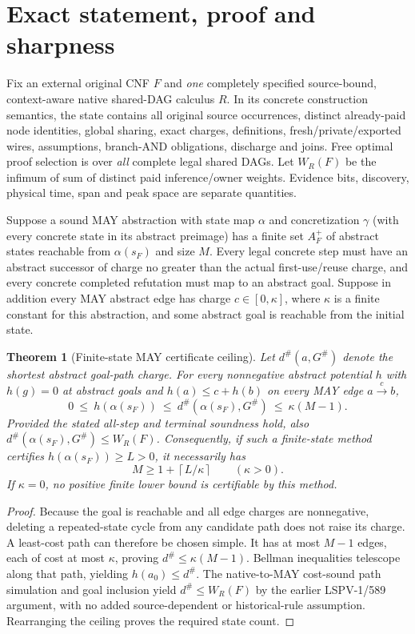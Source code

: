 \documentclass[11pt]{article}
\newtheorem{theorem}{Theorem}
\begin{document}
\section*{Exact statement, proof and sharpness}
Fix an external original CNF $F$ and \emph{one} completely specified source-bound, context-aware native shared-DAG calculus $R$. In its concrete construction semantics, the state contains all original source occurrences, distinct already-paid node identities, global sharing, exact charges, definitions, fresh/private/exported wires, assumptions, branch-AND obligations, discharge and joins. Free optimal proof selection is over \emph{all} complete legal shared DAGs. Let $W_R(F)$ be the infimum of sum of distinct paid inference/owner weights. Evidence bits, discovery, physical time, span and peak space are separate quantities.

Suppose a sound MAY abstraction with state map $\alpha$ and concretization $\gamma$ (with every concrete state in its abstract preimage) has a finite set $A_F^+$ of abstract states reachable from $\alpha(s_F)$ and size $M$. Every legal concrete step must have an abstract successor of charge no greater than the actual first-use/reuse charge, and every concrete completed refutation must map to an abstract goal. Suppose in addition every MAY abstract edge has charge $c\in[0,\kappa]$, where $\kappa$ is a finite constant for this abstraction, and some abstract goal is reachable from the initial state.

\begin{theorem}[Finite-state MAY certificate ceiling]
Let $d^\#(a,G^\#)$ denote the shortest abstract goal-path charge. For every nonnegative abstract potential $h$ with $h(g)=0$ at abstract goals and
$h(a)\leq c+h(b)$ on every MAY edge $a\xrightarrow{c}b$,
\[
0\ \leq\ h(\alpha(s_F))
\ \leq\ d^\#(\alpha(s_F),G^\#)
\ \leq\ \kappa(M-1).
\]
Provided the stated all-step and terminal soundness hold, also $d^\#(\alpha(s_F),G^\#)\leq W_R(F)$.
Consequently, if such a finite-state method certifies $h(\alpha(s_F))\geq L>0$, it necessarily has
\[
\boxed{\qquad M\geq 1+\left\lceil L/\kappa\right\rceil
\qquad(\kappa>0).\qquad}
\]
If $\kappa=0$, no positive finite lower bound is certifiable by this method.
\end{theorem}

\begin{proof}
Because the goal is reachable and all edge charges are nonnegative, deleting a repeated-state cycle from any candidate path does not raise its charge. A least-cost path can therefore be chosen simple. It has at most $M-1$ edges, each of cost at most $\kappa$, proving $d^\#\leq\kappa(M-1)$. Bellman inequalities telescope along that path, yielding $h(a_0)\leq d^\#$. The native-to-MAY cost-sound path simulation and goal inclusion yield $d^\#\leq W_R(F)$ by the earlier LSPV-1/589 argument, with no added source-dependent or historical-rule assumption. Rearranging the ceiling proves the required state count.
\end{proof}
\end{document}
